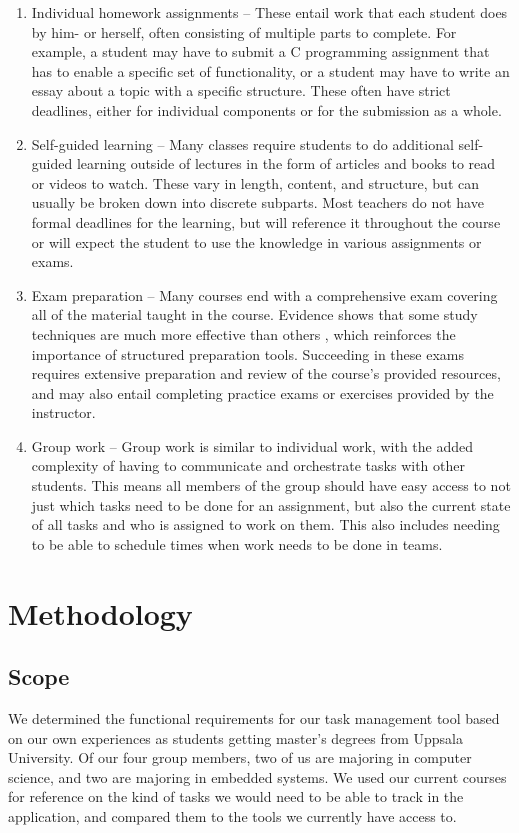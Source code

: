 \documentclass[11pt,oneside]{article}
\begin{document}
\begin{enumerate}
\item Individual homework assignments – These entail work that each student does by him- or herself, often consisting of multiple parts to complete. For example, a student may have to submit a C programming assignment that has to enable a specific set of functionality, or a student may have to write an essay about a topic with a specific structure. These often have strict deadlines, either for individual components or for the submission as a whole.
\item Self-guided learning – Many classes require students to do additional self-guided learning outside of lectures in the form of articles and books to read or videos to watch. These vary in length, content, and structure, but can usually be broken down into discrete subparts. Most teachers do not have formal deadlines for the learning, but will reference it throughout the course or will expect the student to use the knowledge in various assignments or exams.
\item Exam preparation – Many courses end with a comprehensive exam covering all of the material taught in the course. Evidence shows that some study techniques are much more effective than others \citep{dunlosky2013improving}, which reinforces the importance of structured preparation tools. Succeeding in these exams requires extensive preparation and review of the course’s provided resources, and may also entail completing practice exams or exercises provided by the instructor.
\item Group work – Group work is similar to individual work, with the added complexity of having to communicate and orchestrate tasks with other students. This means all members of the group should have easy access to not just which tasks need to be done for an assignment, but also the current state of all tasks and who is assigned to work on them. This also includes needing to be able to schedule times when work needs to be done in teams.
\end{enumerate}



\section{Methodology}
\subsection{Scope}
We determined the functional requirements for our task management tool based on our own experiences as students getting master’s degrees from Uppsala University. Of our four group members, two of us are majoring in computer science, and two are majoring in embedded systems. We used our current courses for reference on the kind of tasks we would need to be able to track in the application, and compared them to the tools we currently have access to. 
\end{document}
